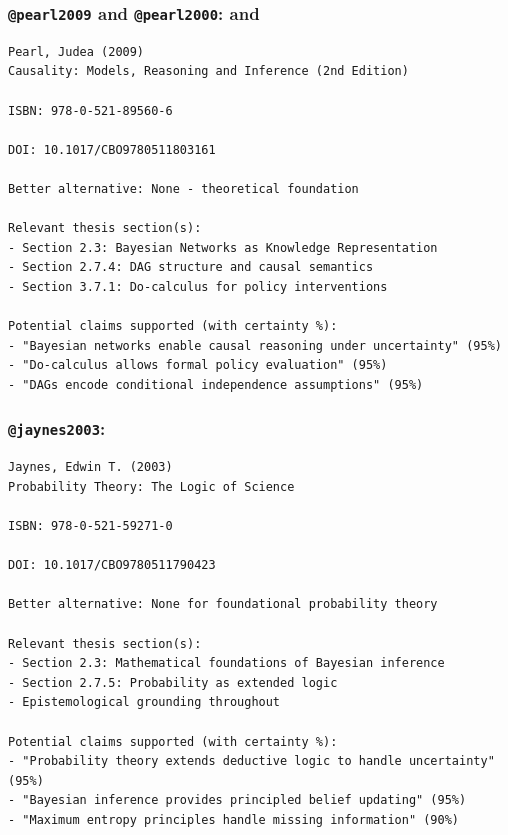 \documentclass[
  11pt,
  letterpaper,
]{book}
\begin{document}
\subsubsection*{\texorpdfstring{\texttt{@pearl2009} and
\texttt{@pearl2000}: \textcite{pearl2000} and
\textcite{pearl2009}}{@pearl2009 and @pearl2000: @pearl2000 and @pearl2009}}\label{pearl2009-and-pearl2000-pearl2000-and-pearl2009}

\begin{verbatim}
Pearl, Judea (2009)
Causality: Models, Reasoning and Inference (2nd Edition)

ISBN: 978-0-521-89560-6

DOI: 10.1017/CBO9780511803161

Better alternative: None - theoretical foundation

Relevant thesis section(s):
- Section 2.3: Bayesian Networks as Knowledge Representation
- Section 2.7.4: DAG structure and causal semantics
- Section 3.7.1: Do-calculus for policy interventions

Potential claims supported (with certainty %):
- "Bayesian networks enable causal reasoning under uncertainty" (95%)
- "Do-calculus allows formal policy evaluation" (95%)
- "DAGs encode conditional independence assumptions" (95%)
\end{verbatim}

\subsubsection*{\texorpdfstring{\texttt{@jaynes2003}:
\textcite{jaynes2003}}{@jaynes2003: @jaynes2003}}\label{jaynes2003-jaynes2003}

\begin{verbatim}
Jaynes, Edwin T. (2003)
Probability Theory: The Logic of Science

ISBN: 978-0-521-59271-0

DOI: 10.1017/CBO9780511790423

Better alternative: None for foundational probability theory

Relevant thesis section(s):
- Section 2.3: Mathematical foundations of Bayesian inference
- Section 2.7.5: Probability as extended logic
- Epistemological grounding throughout

Potential claims supported (with certainty %):
- "Probability theory extends deductive logic to handle uncertainty" (95%)
- "Bayesian inference provides principled belief updating" (95%)
- "Maximum entropy principles handle missing information" (90%)
\end{verbatim}
\end{document}
